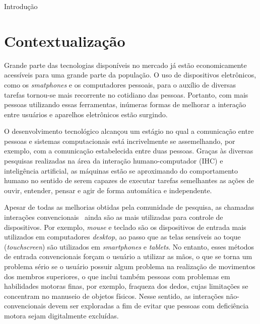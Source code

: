 \begin{chapter}{Introdução}

\section{Contextualização}

Grande parte das tecnologias disponíveis no mercado já estão economicamente
acessíveis para uma grande parte da população. O uso de dispositivos
eletrônicos, como os \textit{smatphones} e os computadores pessoais, para o
auxílio de diversas tarefas tornou-se mais recorrente no cotidiano das pessoas.
Portanto, com mais pessoas utilizando essas ferramentas, inúmeras formas de
melhorar a interação entre usuários e aparelhos eletrônicos estão surgindo. %

O desenvolvimento tecnológico alcançou um estágio no qual a comunicação entre
pessoas e sistemas computacionais está incrivelmente se assemelhando, por
exemplo, com a comunicação estabelecida entre duas pessoas. Graças às diversas
pesquisas realizadas na área da interação humano-computador (IHC) e inteligência
artificial, as máquinas estão se aproximando do comportamento humano no sentido
de serem capazes de executar tarefas semelhantes as ações de ouvir, entender,
pensar e agir de forma automática e independente. %

Apesar de todas as melhorias obtidas pela comunidade de pesquisa, as chamadas
interações convencionais~\cite{Preece15} ainda são as mais utilizadas para
controle de dispositivos. Por exemplo, \textit{mouse} e teclado são os
dispositivos de entrada mais utilizados em computadores \textit{desktop}, ao
passo que as telas sensíveis ao toque (\textit{touchscreen}) são utilizados em
\textit{smartphones} e \textit{tablets}. No entanto, esses métodos de entrada
convencionais forçam o usuário a utilizar as mãos, o que se torna um problema
sério se o usuário possuir algum problema na realização de movimentos dos
membros superiores, o que inclui também pessoas com problemas em habilidades
motoras finas, por exemplo, fraqueza dos dedos, cujas limitações se concentram
no manuseio de objetos físicos. Nesse sentido, as interações não-convencionais
devem ser exploradas a fim de evitar que pessoas com deficiência motora sejam
digitalmente excluídas. %


\end{chapter}
